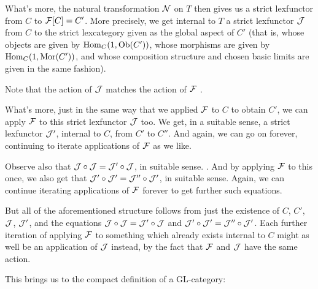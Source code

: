 What's more, the natural transformation $\mathcal{N}$ on $T$ then gives us a strict lexfunctor from $C$ to $\mathcal{F}[C] = C'$. More precisely, we get internal to $T$ a strict lexfunctor $\mathcal{J}$ from $C$ to the strict lexcategory given as the global aspect of $C'$ (that is, whose objects are given by $\operatorname{Hom}_C(1, \operatorname{Ob}(C'))$, whose morphisms are given by $\operatorname{Hom}_C(1, \operatorname{Mor}(C'))$, and whose composition structure and chosen basic limits are given in the same fashion).

Note that the action of $\mathcal{J}$ matches the action of $\mathcal{F}$ \TODO.

What's more, just in the same way that we applied $\mathcal{F}$ to $C$ to obtain $C'$, we can apply $\mathcal{F}$ to this strict lexfunctor $\mathcal{J}$ too. We get, in a suitable sense, a strict lexfunctor $\mathcal{J}'$, internal to $C$, from $C'$ to $C''$. And again, we can go on forever, continuing to iterate applications of $\mathcal{F}$ as we like. \TODO

Observe also that $\mathcal{J} \circ \mathcal{J} = \mathcal{J}' \circ \mathcal{J}$, in suitable sense. \TODO. And by applying $\mathcal{F}$ to this once, we also get that $\mathcal{J}' \circ \mathcal{J}' = \mathcal{J}'' \circ \mathcal{J}'$, in suitable sense. \TODO Again, we can continue iterating applications of $\mathcal{F}$ forever to get further such equations.

But all of the aforementioned structure follows from just the existence of $C$, $C'$, $\mathcal{J}$, $\mathcal{J}'$, and the equations $\mathcal{J} \circ \mathcal{J} = \mathcal{J}' \circ \mathcal{J}$ and $\mathcal{J}' \circ \mathcal{J}' = \mathcal{J}'' \circ \mathcal{J}'$. Each further iteration of applying $\mathcal{F}$ to something which already exists internal to $C$ might as well be an application of $\mathcal{J}$ instead, by the fact that $\mathcal{F}$ and $\mathcal{J}$ have the same action.

This brings us to the compact definition of a GL-category:

